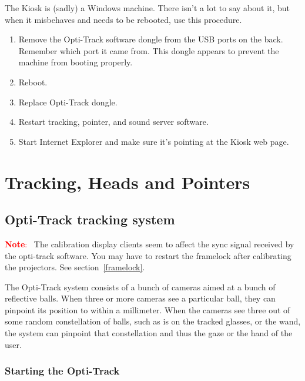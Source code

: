 \documentclass[11pt]{article}
\newenvironment{note}[1][Note]{\begin{lrbox}{\notebox}%
    \begin{minipage}{0.9\columnwidth}\textcolor{red}{\textbf{#1}:~}}%
    {\end{minipage}\end{lrbox}\begin{center}\setlength{\fboxsep}{8pt}%
    \fbox{\usebox{\notebox}}\end{center}}
\begin{document}
The Kiosk is (sadly) a Windows machine.  There isn't a lot to say
about it, but when it misbehaves and needs to be rebooted, use this
procedure.

\begin{enumerate}
\item Remove the Opti-Track software dongle from the USB ports on the
  back.  Remember which port it came from.  This dongle appears to
  prevent the machine from booting properly.

\item Reboot.

\item Replace Opti-Track dongle.

\item Restart tracking, pointer, and sound server software.

\item Start Internet Explorer and make sure it's pointing at the Kiosk
  web page.

\end{enumerate}


\section{Tracking, Heads and Pointers}

\subsection{Opti-Track tracking system}
\label{opti-track}

\begin{note}
  The calibration display clients seem to affect the sync signal
  received by the opti-track software.  You may have to restart the
  framelock after calibrating the projectors.  See
  section~\ref{framelock}.
\end{note}

The Opti-Track system consists of a bunch of cameras aimed at a bunch
of reflective balls.  When three or more cameras see a particular
ball, they can pinpoint its position to within a millimeter.  When the
cameras see three out of some random constellation of balls, such as
is on the tracked glasses, or the wand, the system can pinpoint that
constellation and thus the gaze or the hand of the user.



\subsubsection{Starting the Opti-Track}
\end{document}
